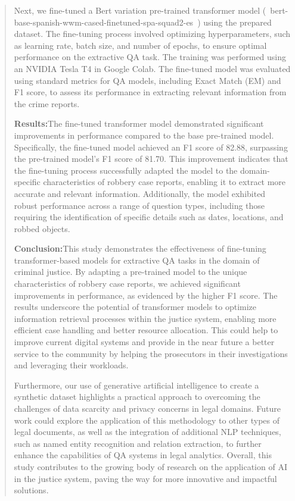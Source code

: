 \documentclass[journal]{article}
\newcommand{\abstractsection}[2]{\noindent\textbf{#1:}#2\par\vspace{0.5em}}
\begin{document}
\begin{abstract}
{    Next, we fine-tuned a Bert variation pre-trained transformer model (~bert-base-spanish-wwm-cased-finetuned-spa-squad2-es~) using the prepared dataset. The fine-tuning process involved optimizing hyperparameters, such as learning rate, batch size, and number of epochs, to ensure optimal performance on the extractive QA task. The training was performed using an NVIDIA Tesla T4 in Google Colab. The fine-tuned model was evaluated using standard metrics for QA models, including Exact Match (EM) and F1 score, to assess its performance in extracting relevant information from the crime reports.}

    \abstractsection{Results}{The fine-tuned transformer model demonstrated significant improvements in performance compared to the base pre-trained model. Specifically, the fine-tuned model achieved an F1 score of 82.88, surpassing the pre-trained model's F1 score of 81.70. This improvement indicates that the fine-tuning process successfully adapted the model to the domain-specific characteristics of robbery case reports, enabling it to extract more accurate and relevant information. Additionally, the model exhibited robust performance across a range of question types, including those requiring the identification of specific details such as dates, locations, and robbed objects.} 


    \abstractsection{Conclusion}{This study demonstrates the effectiveness of fine-tuning transformer-based models for extractive QA tasks in the domain of criminal justice. By adapting a pre-trained model to the unique characteristics of robbery case reports, we achieved significant improvements in performance, as evidenced by the higher F1 score. The results underscore the potential of transformer models to optimize information retrieval processes within the justice system, enabling more efficient case handling and better resource allocation. This could help to improve current digital systems and provide in the near future a better service to the community by helping the prosecutors in their investigations and leveraging their workloads.

    Furthermore, our use of generative artificial intelligence to create a synthetic dataset highlights a practical approach to overcoming the challenges of data scarcity and privacy concerns in legal domains. Future work could explore the application of this methodology to other types of legal documents, as well as the integration of additional NLP techniques, such as named entity recognition and relation extraction, to further enhance the capabilities of QA systems in legal analytics. Overall, this study contributes to the growing body of research on the application of AI in the justice system, paving the way for more innovative and impactful solutions.}
\end{abstract}


\printbibliography
\end{document}
